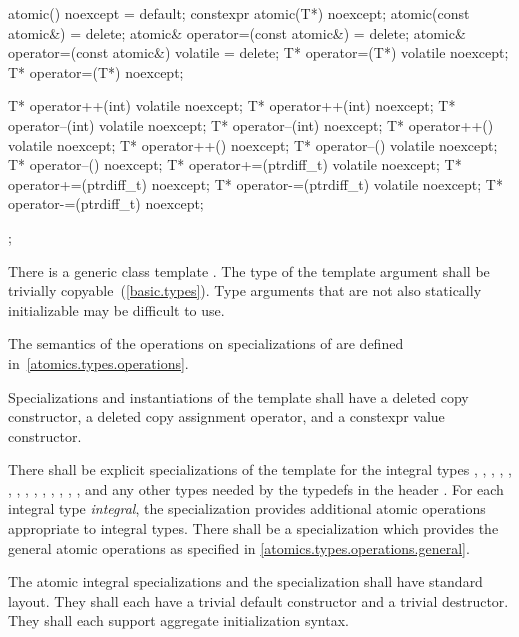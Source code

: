\begin{codeblock}
{{    atomic() noexcept = default;
    constexpr atomic(T*) noexcept;
    atomic(const atomic&) = delete;
    atomic& operator=(const atomic&) = delete;
    atomic& operator=(const atomic&) volatile = delete;
    T* operator=(T*) volatile noexcept;
    T* operator=(T*) noexcept;

    T* operator++(int) volatile noexcept;
    T* operator++(int) noexcept;
    T* operator--(int) volatile noexcept;
    T* operator--(int) noexcept;
    T* operator++() volatile noexcept;
    T* operator++() noexcept;
    T* operator--() volatile noexcept;
    T* operator--() noexcept;
    T* operator+=(ptrdiff_t) volatile noexcept;
    T* operator+=(ptrdiff_t) noexcept;
    T* operator-=(ptrdiff_t) volatile noexcept;
    T* operator-=(ptrdiff_t) noexcept;
  };
}
\end{codeblock}

\pnum
There is a generic class template . The type of the template argument
 shall be trivially copyable~(\ref{basic.types}). \enternote Type arguments that are
not also statically initializable may be difficult to use. \exitnote

\pnum
The semantics of the operations on specializations of  are defined
in~\ref{atomics.types.operations}.

\pnum
Specializations and instantiations of the  template shall have a deleted copy constructor, a deleted
copy assignment operator, and a constexpr value constructor.

\pnum
There shall be explicit specializations of the 
template for the integral types
,
,
,
,
,
,
,
,
,
,
,
,
,
,
and any other types needed by the typedefs in the header .
For each integral type \textit{integral}, the specialization
 provides additional atomic operations appropriate to integral types.
There shall be a specialization  which provides the general
atomic operations as specified in \ref{atomics.types.operations.general}.

\pnum
The atomic integral specializations and the specialization 
shall have standard layout. They shall each have a trivial default constructor
and a trivial destructor. They shall each support aggregate initialization
syntax.


